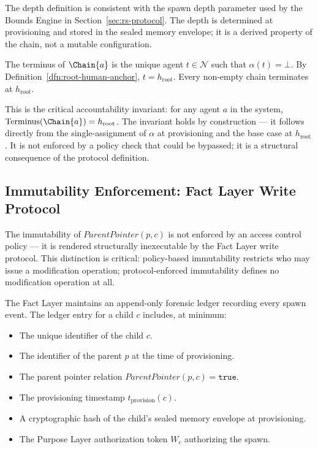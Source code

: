 The depth definition is consistent with the spawn depth parameter used by the Bounds Engine in Section~\ref{sec:rs-protocol}. The depth is determined at provisioning and stored in the sealed memory envelope; it is a derived property of the chain, not a mutable configuration.

\begin{dfn}
\label{dfn:chain-terminus}
The terminus of $\Chain{a}$ is the unique agent $t \in \mathcal{N}$ such that $\alpha(t) = \bot$. By Definition~\ref{dfn:root-human-anchor}, $t = h_{\text{root}}$. Every non-empty chain terminates at $h_{\text{root}}$.
\end{dfn}

This is the critical accountability invariant: for any agent $a$ in the system, $\text{Terminus}(\Chain{a}) = h_{\text{root}}$. The invariant holds by construction — it follows directly from the single-assignment of $\alpha$ at provisioning and the base case at $h_{\text{root}}$. It is not enforced by a policy check that could be bypassed; it is a structural consequence of the protocol definition.

\subsection{Immutability Enforcement: Fact Layer Write Protocol}
\label{sec:fact-layer-immutability}

The immutability of $ParentPointer(p, c)$ is not enforced by an access control policy — it is rendered structurally inexecutable by the Fact Layer write protocol. This distinction is critical: policy-based immutability restricts who may issue a modification operation; protocol-enforced immutability defines no modification operation at all.

The Fact Layer maintains an append-only forensic ledger recording every spawn event. The ledger entry for a child $c$ includes, at minimum:

\begin{itemize}
    \item The unique identifier of the child $c$.
    \item The identifier of the parent $p$ at the time of provisioning.
    \item The parent pointer relation $ParentPointer(p, c) = \texttt{true}$.
    \item The provisioning timestamp $t_{\text{provision}}(c)$.
    \item A cryptographic hash of the child's sealed memory envelope at provisioning.
    \item The Purpose Layer authorization token $W_c$ authorizing the spawn.
\end{itemize}

